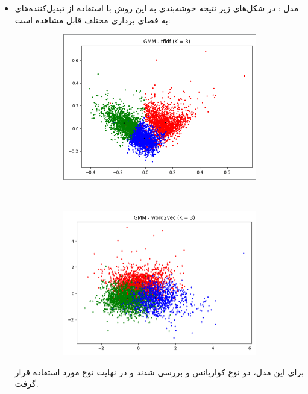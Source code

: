 \documentclass[11pt]{article}
\begin{document}
\begin{itemize}
\item
مدل  : در شکل‌های زیر نتیجه خوشه‌بندی به این روش با استفاده از تبدیل‌کننده‌های به فضای برداری مختلف قابل مشاهده است: \\
\begin{figure}[H]
\begin{center}
\begin{subfigure}{0.4\textwidth}
\includegraphics[width=\textwidth]{pics/gmm_tfidf.png}
\caption{}
\end{subfigure}
~
\begin{subfigure}{0.4\textwidth}
\includegraphics[width=\textwidth]{pics/gmm_w2v.png}
\caption{}
\end{subfigure}
\end{center}
\end{figure}
برای این مدل، دو نوع کواریانس  و  بررسی شدند و در نهایت نوع  مورد استفاده قرار گرفت.


\end{itemize}
\end{document}
